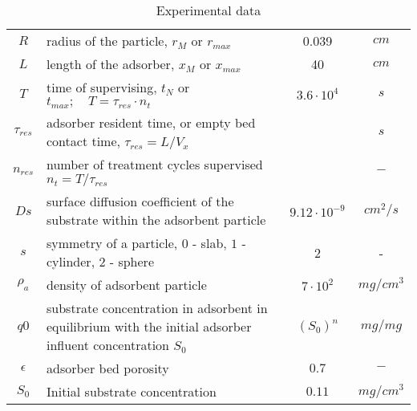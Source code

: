 \documentclass[12pt]{article}
\begin{document}
\noindent
\begin{table}%
	\caption{Experimental data \label{tab:expData}}
\begin{tabularx}{\linewidth}{ | c | X | c | c | } \hline
	$R$ & radius of the particle, $r_M$ or $r_{max}$ & 0.039 & $cm$ \\
	$L$ & length of the adsorber, $x_M$ or $x_{max}$ & 40 & $cm$ \\
	$T$ & time of supervising, $t_N$ or $t_{max}; \quad T=\tau_{res}\cdot n_{t}$ & $3.6\cdot 10^4$ & $s$ \\
	$\tau_{res}$ & adsorber resident time, or empty bed contact time, $\tau_{res}=L/V_{x}$ &  & $s$ \\
	$n_{res}$ & number of treatment cycles supervised $n_t=T/\tau_{res}$ &  & $-$ \\
	$Ds$ & surface diffusion coefficient of the substrate within the adsorbent particle &$9.12\cdot 10^{-9}$& $cm^2/s$\\
	$s$ & symmetry of a particle, $0$ - slab, $1$ - cylinder, $2$ - sphere & 2 & - \\
	$\rho_a$ & density of adsorbent particle &$7\cdot 10^{2}$& $mg/cm^3$\\
	$q0$ & substrate concentration in adsorbent in equilibrium with the initial adsorber influent concentration $S_0$ & $(S_0)^n$ & $mg/mg$ \\
	$\epsilon$ & adsorber bed porosity & $0.7$ & $-$\\
	$S_0$ & Initial substrate concentration & $0.11 $ & $mg/cm^3$\\
	\hline
\end{tabularx}
\end{table}     
\end{document}
